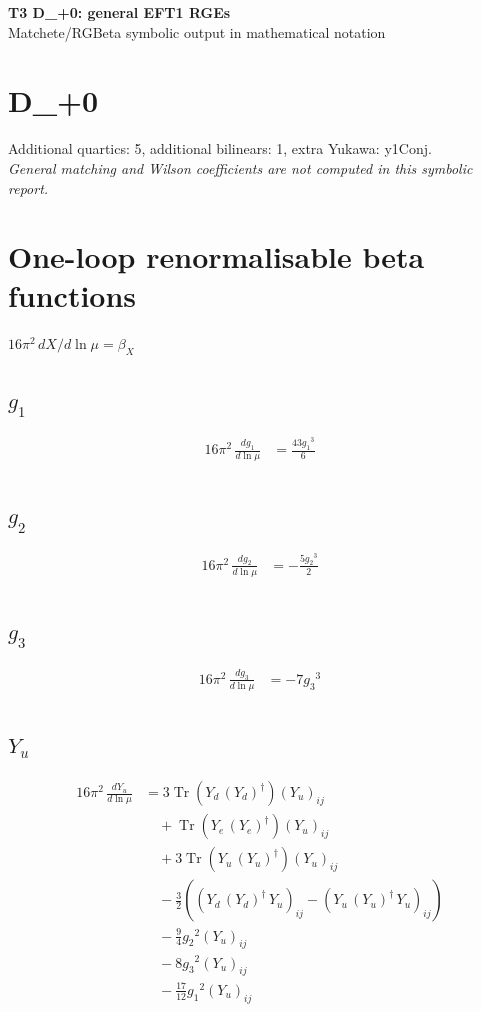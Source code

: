 \documentclass[10pt,a4paper]{article}
\begin{document}
\begin{center}
{\Large\bfseries T3 D\_+0: general EFT1 RGEs}\\[4pt]
Matchete/RGBeta symbolic output in mathematical notation
\end{center}
\bigskip
\section*{D\_+0}
Additional quartics: 5, additional bilinears: 1, extra Yukawa: y1Conj.\\
\emph{General matching and Wilson coefficients are not computed in this symbolic report.}
\clearpage
\section*{One-loop renormalisable beta functions}
$16\pi^2\,dX/d\ln\mu=\beta_X$
\subsection*{$g_1$}
\begin{align*}
16\pi^2\,\frac{d g_1}{d\ln\mu} &=\frac{43 {g_1}^3}{6} \\
\end{align*}
\subsection*{$g_2$}
\begin{align*}
16\pi^2\,\frac{d g_2}{d\ln\mu} &=-\frac{5 {g_2}^3}{2} \\
\end{align*}
\subsection*{$g_3$}
\begin{align*}
16\pi^2\,\frac{d g_3}{d\ln\mu} &=-7 {g_3}^3 \\
\end{align*}
\subsection*{$Y_u$}
\begin{align*}
16\pi^2\,\frac{d Y_u}{d\ln\mu} &=3 \operatorname{Tr}\!\left({Y_d}\,\left({Y_d}\right)^{\dagger}\right) \left({Y_u}\right)_{ij} \\
&\quad +\operatorname{Tr}\!\left({Y_e}\,\left({Y_e}\right)^{\dagger}\right) \left({Y_u}\right)_{ij} \\
&\quad +3 \operatorname{Tr}\!\left({Y_u}\,\left({Y_u}\right)^{\dagger}\right) \left({Y_u}\right)_{ij} \\
&\quad -\frac{3}{2} (\left({Y_d}\,\left({Y_d}\right)^{\dagger}\,{Y_u}\right)_{ij}-\left({Y_u}\,\left({Y_u}\right)^{\dagger}\,{Y_u}\right)_{ij}) \\
&\quad -\frac{9}{4} {g_2}^2 \left({Y_u}\right)_{ij} \\
&\quad -8 {g_3}^2 \left({Y_u}\right)_{ij} \\
&\quad -\frac{17}{12} {g_1}^2 \left({Y_u}\right)_{ij} \\
\end{align*}
\end{document}

